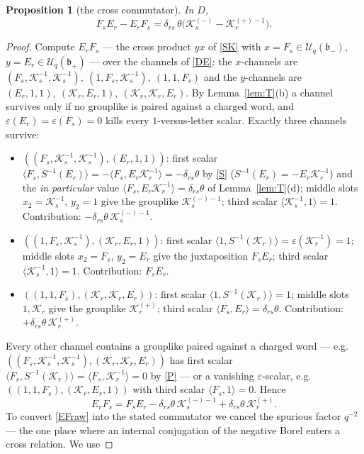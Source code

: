 \documentclass[11pt]{article}
\newtheorem{proposition}[theorem]{Proposition}
\theoremstyle{definition}
\theoremstyle{remark}
\newcommand{\la}{\langle}
\newcommand{\ra}{\rangle}
\newcommand{\Uq}{\mathcal{U}_q}
\newcommand{\bp}{\mathfrak{b}_+}
\newcommand{\bm}{\mathfrak{b}_-}
\newcommand{\del}{\delta}
\newcommand{\cK}{\mathcal K}
\newcommand{\vep}{\varepsilon}
\newcommand{\tht}{\theta}
\begin{document}
\begin{proposition}[the cross commutator]\label{prop:EF}
In $D$,
\[
F_sE_r-E_rF_s=\del_{rs}\,\tht\bigl(\cK_s^{(-)}-\cK_r^{(+)-1}\bigr) .
\]
\end{proposition}
\begin{proof}
Compute $E_rF_s$ — the cross product $yx$ of \eqref{SK} with
$x=F_s\in\Uq(\bm)$, $y=E_r\in\Uq(\bp)$ — over the channels of
\eqref{DE}: the $x$-channels are
$(F_s,\cK_s^{-1},\cK_s^{-1}),\ (1,F_s,\cK_s^{-1}),\ (1,1,F_s)$
and the $y$-channels are
$(E_r,1,1),\ (\cK_r,E_r,1),\ (\cK_r,\cK_r,E_r)$.
By Lemma~\ref{lem:T}(b) a channel survives only if no grouplike is
paired against a charged word, and $\vep(E_r)=\vep(F_s)=0$ kills
every $1$-versus-letter scalar.  Exactly three channels survive:
\begin{itemize}
\item $((F_s,\cK_s^{-1},\cK_s^{-1}),(E_r,1,1))$: first scalar
  $\la F_s,S^{-1}(E_r)\ra=-\la F_s,E_r\cK_r^{-1}\ra
  =-\del_{rs}\tht$ by \eqref{S}
  ($S^{-1}(E_r)=-E_r\cK_r^{-1}$) and the \emph{in particular}
  value $\la F_s,E_r\cK_r^{-1}\ra=\del_{rs}\tht$ of
  Lemma~\ref{lem:T}(d); middle slots $x_2=\cK_s^{-1}$, $y_2=1$ give
  the grouplike $\cK_s^{(-)-1}$; third scalar
  $\la\cK_s^{-1},1\ra=1$.
  Contribution: $-\del_{rs}\tht\,\cK_s^{(-)-1}$.
\item $((1,F_s,\cK_s^{-1}),(\cK_r,E_r,1))$: first scalar
  $\la1,S^{-1}(\cK_r)\ra=\vep(\cK_r^{-1})=1$; middle slots $x_2=F_s$,
  $y_2=E_r$ give the juxtaposition $F_sE_r$; third scalar
  $\la\cK_s^{-1},1\ra=1$.  Contribution: $F_sE_r$.
\item $((1,1,F_s),(\cK_r,\cK_r,E_r))$: first scalar
  $\la1,S^{-1}(\cK_r)\ra=1$; middle slots $1,\cK_r$ give the grouplike
  $\cK_r^{(+)}$; third scalar $\la F_s,E_r\ra=\del_{rs}\tht$.
  Contribution: $+\del_{rs}\tht\,\cK_r^{(+)}$.
\end{itemize}
Every other channel contains a grouplike paired against a charged
word — e.g.\
$((F_s,\cK_s^{-1},\cK_s^{-1}),(\cK_r,\cK_r,E_r))$ has first scalar
$\la F_s,S^{-1}(\cK_r)\ra=\la F_s,\cK_r^{-1}\ra=0$ by \eqref{P} — or a
vanishing $\vep$-scalar, e.g.\ $((1,1,F_s),(\cK_r,E_r,1))$ with
third scalar $\la F_s,1\ra=0$.  Hence
\begin{equation}
E_rF_s=F_sE_r-\del_{rs}\tht\,\cK_s^{(-)-1}
+\del_{rs}\tht\,\cK_r^{(+)} .
\label{EFraw}\tag{EF}
\end{equation}
To convert \eqref{EFraw} into the stated commutator we cancel the
spurious factor $q^{-2}$ — the one place where an internal
conjugation of the negative Borel enters a cross relation.  We use

\end{proof}
\end{document}
